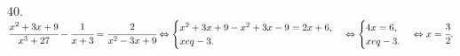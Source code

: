 40. $\cfrac{x^2+3x+9}{x^3+27}-\cfrac{1}{x+3}=\cfrac{2}{x^2-3x+9}\Leftrightarrow \begin{cases}x^2+3x+9-x^2+3x-9=2x+6,\\ x
eq-3.\end{cases}
\Leftrightarrow\begin{cases} 4x=6,\\ x
eq-3.\end{cases}\Leftrightarrow x=\cfrac{3}{2}.$\\
